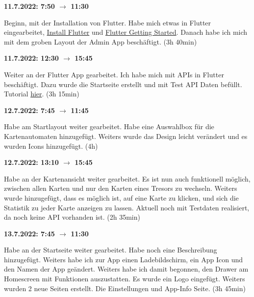 \vspace{0.5cm}

\textbf{11.7.2022: 7:50 $\rightarrow$ 11:30} \

Beginn, mit der Installation von Flutter. Habe mich etwas in Flutter eingearbeitet, \href{https://docs.flutter.dev/get-started/install}{Install Flutter} und \href{https://docs.flutter.dev/get-started/codelab}{Flutter Getting Started}. Danach habe ich mich mit dem groben Layout der Admin App beschäftigt. (3h 40min)

\vspace{0.5cm}

\textbf{11.7.2022: 12:30 $\rightarrow$ 15:45} \

Weiter an der Flutter App gearbeitet. Ich habe mich mit APIs in Flutter beschäftigt. Dazu wurde die Startseite erstellt und mit Test API Daten befüllt. Tutorial \href{https://flutterforyou.com/how-to-fetch-data-from-api-and-show-in-flutter-listview/}{hier}. (3h 15min)

\vspace{0.5cm}

\textbf{12.7.2022: 7:45 $\rightarrow$ 11:45} \

Habe am Startlayout weiter gearbeitet. Habe eine Auswahlbox für die Kartenautomaten hinzugefügt. Weiters wurde das Design leicht verändert und es wurden Icons hinzugefügt. (4h)

\vspace{0.5cm}

\textbf{12.7.2022: 13:10 $\rightarrow$ 15:45} \

Habe an der Kartenansicht weiter gearbeitet. Es ist nun auch funktionell möglich, zwischen allen Karten und nur den Karten eines Tresors zu wechseln. Weiters wurde hinzugefügt, dass es möglich ist, auf eine Karte zu klicken, und sich die Statistik zu jeder Karte anzeigen zu lassen. Aktuell noch mit Testdaten realisiert, da noch keine API vorhanden ist. (2h 35min)

\vspace{0.5cm}

\textbf{13.7.2022: 7:45 $\rightarrow$ 11:30} \

Habe an der Startseite weiter gearbeitet. Habe noch eine Beschreibung hinzugefügt. Weiters habe ich zur App einen Ladebildschirm, ein App Icon und den Namen der App geändert. Weiters habe ich damit begonnen, den Drawer am Homescreen mit Funktionen auszustatten. Es wurde ein Logo eingefügt. Weiters wurden 2 neue Seiten erstellt. Die Einstellungen und App-Info Seite. (3h 45min)

